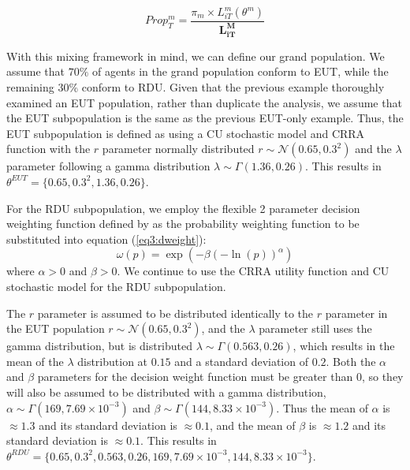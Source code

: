 \documentclass[../main.tex]{subfiles}
\begin{document}
\begin{equation}
	\label{eq3:Propm}
	\mathit{Prop^m_{T}} = \frac{\pi_m \times L_{iT}^m(\theta^m) }{\bm{L_{iT}^M}}
\end{equation}

With this mixing framework in mind, we can define our grand population.
We assume that $70\%$ of agents in the grand population conform to EUT, while the remaining $30\%$ conform to RDU.
Given that the previous example thoroughly examined an EUT population, rather than duplicate the analysis, we assume that the EUT subpopulation is the same as the previous EUT-only example.
Thus, the EUT subpopulation is defined as using a CU stochastic model and CRRA function with the $r$ parameter normally distributed $r \sim \mathcal{N}(0.65 , 0.3^2 )$ and the $\lambda$ parameter following a gamma distribution $\lambda \sim \Gamma(1.36 , 0.26)$.
This results in $\theta^{EUT} = \lbrace 0.65 ,0.3^2, 1.36 , 0.26\rbrace$.

For the RDU subpopulation, we employ the flexible 2 parameter decision weighting function defined by \textcite{Prelec1998} as the probability weighting function to be substituted into equation (\ref{eq3:dweight}):
\begin{equation}
	\label{eq3:pw:pre}
	\omega(p)=\exp(-\beta(-\ln(p))^\alpha)
\end{equation}
\noindent where $\alpha > 0$ and $\beta > 0$.
We continue to use the CRRA utility function and CU stochastic model for the RDU subpopulation.

The $r$ parameter is assumed to be distributed identically to the $r$ parameter in the EUT population $r \sim \mathcal{N}(0.65 , 0.3^2 )$, and the $\lambda$ parameter still uses the gamma distribution, but is distributed $\lambda \sim \Gamma(0.563 , 0.26)$, which results in the mean of the $\lambda$ distribution at $0.15$ and a standard deviation of $0.2$.{\footnotemark}
Both the $\alpha$ and $\beta$ parameters for the decision weight function must be greater than $0$, so they will also be assumed to be distributed with a gamma distribution, $\alpha \sim \Gamma(169 , 7.69 \times 10^{-3})$ and $\beta \sim \Gamma(144 , 8.33 \times 10^{-3})$.
Thus the mean of $\alpha$ is $\approx 1.3$ and its standard deviation is $\approx 0.1$, and the mean of $\beta$ is $\approx 1.2$ and its standard deviation is $\approx 0.1$.
This results in $\theta^{RDU} = \lbrace  0.65 ,0.3^2,  0.563 , 0.26 , 169 , 7.69 \times 10^{-3} , 144 , 8.33 \times 10^{-3} \rbrace$.

\addtocounter{footnote}{-1}
\end{document}
